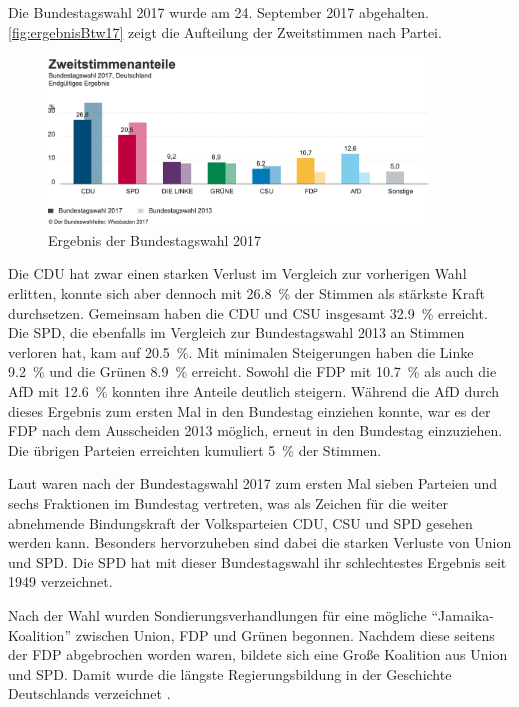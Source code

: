 Die Bundestagswahl \num{2017} wurde am \num{24}. September \num{2017} abgehalten. \autoref{fig:ergebnisBtw17} zeigt die Aufteilung der Zweitstimmen nach Partei.

\begin{figure}[H]
  \centering
  \includegraphics[width=0.9\textwidth]{data/images/ergebnisBtw17.png}
  \caption{Ergebnis der Bundestagswahl \num{2017} \autocite{noauthor_bundestagswahl_nodate}} \label{fig:ergebnisBtw17}
\end{figure}

Die \ac{CDU} hat zwar einen starken Verlust im Vergleich zur vorherigen Wahl erlitten, konnte sich aber dennoch mit \SI{26.8}{\percent} der Stimmen als stärkste Kraft durchsetzen. Gemeinsam haben die \ac{CDU} und \acs{CSU} insgesamt \SI{32.9}{\percent} erreicht. Die \ac{SPD}, die ebenfalls im Vergleich zur Bundestagswahl \num{2013} an Stimmen verloren hat, kam auf \SI{20.5}{\percent}. Mit minimalen Steigerungen haben die Linke \SI{9.2}{\percent} und die Grünen \SI{8.9}{\percent} erreicht. Sowohl die \ac{FDP} mit \SI{10.7}{\percent} als auch die \ac{AfD} mit \SI{12.6}{\percent} konnten ihre Anteile deutlich steigern. Während die \ac{AfD} durch dieses Ergebnis zum ersten Mal in den Bundestag einziehen konnte, war es der \ac{FDP} nach dem Ausscheiden \num{2013} möglich, erneut in den Bundestag einzuziehen. Die übrigen Parteien erreichten kumuliert \SI{5}{\percent} der Stimmen.

Laut \textcite{schmid_deutscher_2021} waren nach der Bundestagswahl \num{2017} zum ersten Mal sieben Parteien und sechs Fraktionen im Bundestag vertreten, was als Zeichen für die weiter abnehmende Bindungskraft der Volksparteien \ac{CDU}, \ac{CSU} und \ac{SPD} gesehen werden kann. Besonders hervorzuheben sind dabei die starken Verluste von Union und \ac{SPD}. Die \ac{SPD} hat mit dieser Bundestagswahl ihr schlechtestes Ergebnis seit \num{1949} verzeichnet.

Nach der Wahl wurden Sondierungsverhandlungen für eine mögliche \enquote{Jamaika-Koalition} zwischen Union, \ac{FDP} und Grünen begonnen. Nachdem diese seitens der \ac{FDP} abgebrochen worden waren, bildete sich eine Große Koalition aus Union und \ac{SPD}. Damit wurde die längste Regierungsbildung in der Geschichte Deutschlands verzeichnet \parencite{schmid_deutscher_2021}.


